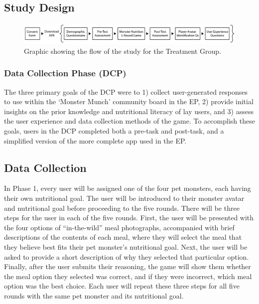 \subsection{Study Design}

\begin{figure}[h]
\includegraphics[width=\textwidth]{samples/images/figure-1.png}
\caption{Graphic showing the flow of the study for the Treatment Group.}
\label{fig:studyflow}
\end{figure}

\subsubsection{Data Collection Phase (DCP)}

The three primary goals of the DCP were to 1) collect user-generated responses to use within the `Monster Munch' community board in the EP, 2) provide initial insights on the prior knowledge and nutritional literacy of lay users, and 3) assess the user experience and data collection methods of the game. 
To accomplish these goals, users in the DCP completed both a pre-task and post-task, and a simplified version of the more complete app used in the EP.


\subsection{Data Collection}

In Phase 1, every user will be assigned one of the four pet monsters, each having their own nutritional goal. 
The user will be introduced to their monster avatar and nutritional goal before proceeding to the five rounds. 
There will be three steps for the user in each of the five rounds. 
First, the user will be presented with the four options of ``in-the-wild'' meal photographs, accompanied with brief descriptions of the contents of each meal, where they will select the meal that they believe best fits their pet monster’s nutritional goal. 
Next, the user will be asked to provide a short description of why they selected that particular option. 
Finally, after the user submits their reasoning, the game will show them whether the meal option they selected was correct, and if they were incorrect, which meal option was the best choice. 
Each user will repeat these three steps for all five rounds with the same pet monster and its nutritional goal. 

